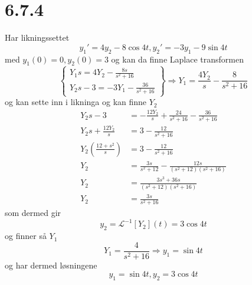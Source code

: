 \documentclass{report}
\newcommand{\nbrack}[1]{\left( #1 \right)}
\newcommand{\bbrack}[1]{\left[ #1 \right]}
\newcommand{\cbrack}[1]{\left\lbrace #1 \right\rbrace}
\newcommand{\iLplc}[1]{\mathscr{L}^{-1}\bbrack{ #1 } (t)}
\begin{document}
\section*{6.7.4}
Har likningssettet
\begin{equation}
  \label{eq:37}
  y_{1}' = 4y_{2} - 8\cos 4t, y_{2}' = -3y_{1} - 9\sin 4t
\end{equation}
med $y_{1}(0) = 0, y_{2}(0) = 3$ og kan da finne Laplace transformen
\begin{equation}
  \label{eq:38}
  \cbrack{
    \begin{array}{l}
      Y_{1}s = 4Y_{2} - \frac{8s}{s^{2} + 16} \\
      Y_{2}s - 3 = -3Y_{1} - \frac{36}{s^{2} + 16}
    \end{array}
  } \Rightarrow Y_{1} = \frac{4Y_{2}}{s} - \frac{8}{s^{2} + 16}
\end{equation}
og kan sette inn i likninga og kan finne $Y_{2}$
\begin{equation}
  \label{eq:39}
  \begin{split}
    Y_{2}s -3 &= -\frac{12Y_{2}}{s} + \frac{24}{s^{2} + 16} - \frac{36}{s^{2} + 16} \\
    Y_{2}s + \frac{12Y_{2}}{s} &= 3 - \frac{12}{s^{2} + 16} \\
    Y_{2} \nbrack{ \frac{12 + s^{2}}{s} } &= 3 - \frac{12}{s^{2} + 16} \\
    Y_{2} &= \frac{3s}{s^{2} + 12} - \frac{12s}{\nbrack{s^{2} + 12}\nbrack{s^{2}+16}} \\
    Y_{2} &= \frac{3s^{3} + 36s}{\nbrack{s^{2}+12}\nbrack{s^{2}+16}} \\
    Y_{2} &= \frac{3s}{s^{2} + 16}
  \end{split}
\end{equation}
som dermed gir
\begin{equation}
  \label{eq:40}
  y_{2} = \iLplc{Y_{2}} = 3\cos 4t
\end{equation}
og finner så $Y_{1}$
\begin{equation}
  \label{eq:41}
  Y_{1} = \frac{4}{s^{2} + 16} \Rightarrow y_{1} = \sin 4t
\end{equation}
og har dermed løsningene
\begin{equation}
  \label{eq:42}
  y_{1} = \sin 4t, y_{2} = 3\cos 4t
\end{equation}
\end{document}
